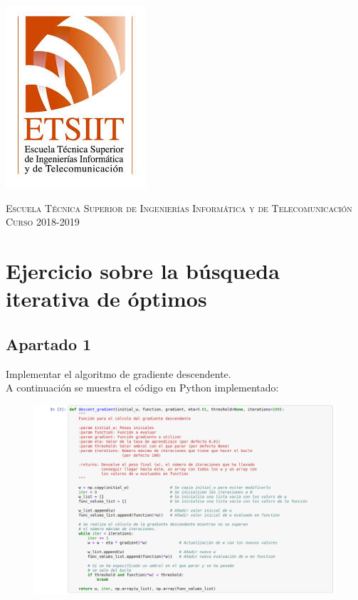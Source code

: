 \documentclass[11pt,a4paper]{article}
\begin{document}
\begin{titlepage}
\begin{minipage}{\textwidth}
\includegraphics[scale=0.3]{img/etsiit.jpeg}

\vspace{0.7cm}
\textsc{Escuela Técnica Superior de Ingenierías Informática y de Telecomunicación}\\
\vspace{1cm}
\textsc{Curso 2018-2019}
\end{minipage}
\end{titlepage}

\tableofcontents
\thispagestyle{empty}				%

\newpage

\section{Ejercicio sobre la búsqueda iterativa de óptimos}

\subsection*{Apartado 1}
\noindent Implementar el algoritmo de gradiente descendente.\\

A continuación se muestra el código en Python implementado:

\begin{figure}[H]
\centering
\includegraphics[scale=0.4]{img/descent_gradient_implementation.png}
\end{figure}
\end{document}
